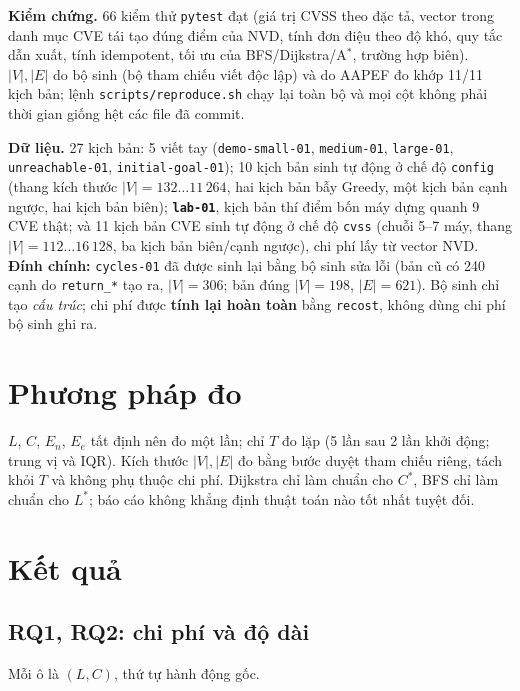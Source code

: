 \documentclass[11pt,a4paper]{article}
\newcommand{\Cs}{C^{*}}
\newcommand{\Ls}{L^{*}}
\newcommand{\V}{|V|}
\newcommand{\E}{|E|}
\newcommand{\En}{E_{n}}
\begin{document}
\textbf{Kiểm chứng.} 66 kiểm thử \texttt{pytest} đạt (giá trị CVSS theo đặc tả, vector trong danh mục CVE tái tạo đúng điểm của NVD, tính đơn điệu theo độ khó, quy tắc dẫn xuất, tính idempotent, tối ưu của BFS/Dijkstra/A$^{*}$, trường hợp biên). $\V,\E$ do bộ sinh (bộ tham chiếu viết độc lập) và do AAPEF đo khớp 11/11 kịch bản; lệnh \texttt{scripts/reproduce.sh} chạy lại toàn bộ và mọi cột không phải thời gian giống hệt các file đã commit.

\textbf{Dữ liệu.} 27 kịch bản: 5 viết tay (\texttt{demo-small-01}, \texttt{medium-01}, \texttt{large-01}, \texttt{unreachable-01}, \texttt{initial-goal-01}); 10 kịch bản sinh tự động ở chế độ \texttt{config} (thang kích thước $\V=132\ldots 11\,264$, hai kịch bản bẫy Greedy, một kịch bản cạnh ngược, hai kịch bản biên); \textbf{\texttt{lab-01}}, kịch bản thí điểm bốn máy dựng quanh 9 CVE thật; và 11 kịch bản CVE sinh tự động ở chế độ \texttt{cvss} (chuỗi 5--7 máy, thang $\V=112\ldots 16\,128$, ba kịch bản biên/cạnh ngược), chi phí lấy từ vector NVD. \textbf{Đính chính:} \texttt{cycles-01} đã được sinh lại bằng bộ sinh sửa lỗi (bản cũ có 240 cạnh do \texttt{return\_*} tạo ra, $\V=306$; bản đúng $\V=198$, $\E=621$). Bộ sinh chỉ tạo \emph{cấu trúc}; chi phí được \textbf{tính lại hoàn toàn} bằng \texttt{recost}, không dùng chi phí bộ sinh ghi ra.

\section{Phương pháp đo}

$L$, $C$, $\En$, $E_e$ tất định nên đo một lần; chỉ $T$ đo lặp (5 lần sau 2 lần khởi động; trung vị và IQR). Kích thước $\V,\E$ đo bằng bước duyệt tham chiếu riêng, tách khỏi $T$ và không phụ thuộc chi phí. Dijkstra chỉ làm chuẩn cho $\Cs$, BFS chỉ làm chuẩn cho $\Ls$; báo cáo không khẳng định thuật toán nào tốt nhất tuyệt đối.

\section{Kết quả}

\subsection{RQ1, RQ2: chi phí và độ dài}

Mỗi ô là $(L,C)$, thứ tự hành động gốc.
\end{document}

